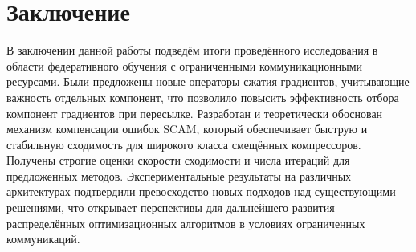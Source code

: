 \section{Заключение}

В заключении данной работы подведём итоги проведённого исследования в области федеративного обучения с ограниченными коммуникационными ресурсами. Были предложены новые операторы сжатия градиентов, учитывающие важность отдельных компонент, что позволило повысить эффективность отбора компонент градиентов при пересылке. Разработан и теоретически обоснован механизм компенсации ошибок SCAM, который обеспечивает быструю и стабильную сходимость для широкого класса смещённых компрессоров. Получены строгие оценки скорости сходимости и числа итераций для предложенных методов. Экспериментальные результаты на различных архитектурах подтвердили превосходство новых подходов над существующими решениями, что открывает перспективы для дальнейшего развития распределённых оптимизационных алгоритмов в условиях ограниченных коммуникаций.

